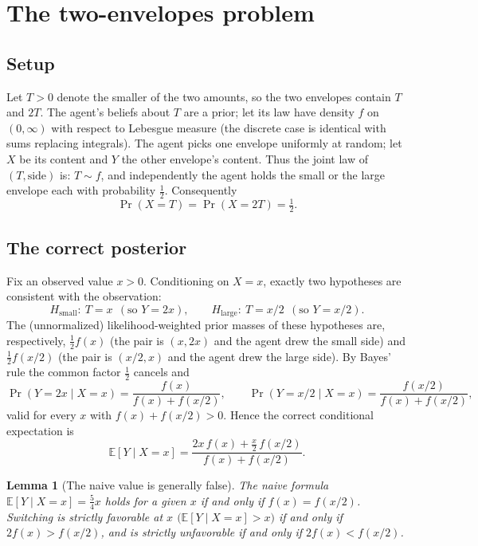 \documentclass{amsart}
\theoremstyle{plain}
\newtheorem{lemma}{Lemma}
\theoremstyle{definition}
\begin{document}
\section{The two-envelopes problem}

\subsection{Setup} Let $T>0$ denote the smaller of the two amounts, so the two
envelopes contain $T$ and $2T$. The agent's beliefs about $T$ are a prior; let
its law have density $f$ on $(0,\infty)$ with respect to Lebesgue measure
(the discrete case is identical with sums replacing integrals). The agent picks
one envelope uniformly at random; let $X$ be its content and $Y$ the other
envelope's content. Thus the joint law of $(T,\text{side})$ is: $T\sim f$, and
independently the agent holds the small or the large envelope each with
probability $\tfrac12$. Consequently
\begin{equation}\label{eq:Xlaw}
\Pr(X=T)=\Pr(X=2T)=\tfrac12 .
\end{equation}

\subsection{The correct posterior} Fix an observed value $x>0$. Conditioning on
$X=x$, exactly two hypotheses are consistent with the observation:
\[
H_{\text{small}}:\ T=x\ \ (\text{so }Y=2x),
\qquad
H_{\text{large}}:\ T=x/2\ \ (\text{so }Y=x/2).
\]
The (unnormalized) likelihood-weighted prior masses of these hypotheses are,
respectively, $\tfrac12 f(x)$ (the pair is $(x,2x)$ and the agent drew the small
side) and $\tfrac12 f(x/2)$ (the pair is $(x/2,x)$ and the agent drew the large
side). By Bayes' rule the common factor $\tfrac12$ cancels and
\begin{equation}\label{eq:posterior}
\Pr(Y=2x\mid X=x)=\frac{f(x)}{f(x)+f(x/2)},
\qquad
\Pr(Y=x/2\mid X=x)=\frac{f(x/2)}{f(x)+f(x/2)},
\end{equation}
valid for every $x$ with $f(x)+f(x/2)>0$. Hence the correct conditional
expectation is
\begin{equation}\label{eq:condexp}
\mathbb E[Y\mid X=x]
=\frac{2x\,f(x)+\tfrac{x}{2}\,f(x/2)}{f(x)+f(x/2)} .
\end{equation}

\begin{lemma}[The naive value is generally false]\label{lem:naive}
The naive formula $\mathbb E[Y\mid X=x]=\tfrac54 x$ holds for a given $x$ if and
only if $f(x)=f(x/2)$. Switching is strictly favorable at $x$
\(\bigl(\mathbb E[Y\mid X=x]>x\bigr)\) if and only if $2f(x)>f(x/2)$, and is
strictly unfavorable if and only if $2f(x)<f(x/2)$.
\end{lemma}
\end{document}
